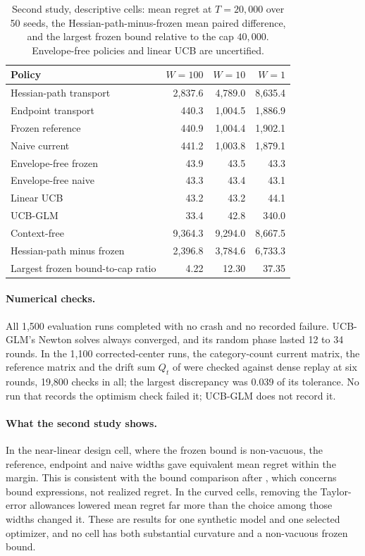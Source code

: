 \begin{table}[H]
\centering
\caption{Second study, descriptive cells: mean regret at $T=20{,}000$ over 50
seeds, the Hessian-path-minus-frozen mean paired
difference, and the largest frozen bound relative to the cap $40{,}000$.
Envelope-free policies and linear UCB are uncertified.}
\label{tab:transport-v3-descriptive}
\begin{tabular}{@{}lrrr@{}}
\toprule
Policy & $W=100$ & $W=10$ & $W=1$ \\
\midrule
Hessian-path transport & 2{,}837.6 & 4{,}789.0 & 8{,}635.4 \\
Endpoint transport & 440.3 & 1{,}004.5 & 1{,}886.9 \\
Frozen reference & 440.9 & 1{,}004.4 & 1{,}902.1 \\
Naive current & 441.2 & 1{,}003.8 & 1{,}879.1 \\
Envelope-free frozen & 43.9 & 43.5 & 43.3 \\
Envelope-free naive & 43.3 & 43.4 & 43.1 \\
Linear UCB & 43.2 & 43.2 & 44.1 \\
UCB-GLM & 33.4 & 42.8 & 340.0 \\
Context-free & 9{,}364.3 & 9{,}294.0 & 8{,}667.5 \\
\midrule
Hessian-path minus frozen & 2{,}396.8 & 3{,}784.6 & 6{,}733.3 \\
Largest frozen bound-to-cap ratio & 4.22 & 12.30 & 37.35 \\
\bottomrule
\end{tabular}
\end{table}

\paragraph{Numerical checks.}
All 1,500 evaluation runs completed with no crash and no recorded failure.
UCB-GLM's Newton solves always converged, and its random phase lasted 12 to 34
rounds. In the 1,100 corrected-center runs, the category-count current matrix,
the reference matrix and the drift sum $Q_t$ of  were
checked against dense replay at six rounds, 19,800 checks in all; the largest
discrepancy was 0.039 of its tolerance. No run that records the optimism
check failed it; UCB-GLM does not record it.

\paragraph{What the second study shows.}
In the near-linear design cell, where the frozen bound is non-vacuous, the
reference, endpoint and naive widths gave equivalent mean regret within the
margin. This is consistent with the bound comparison after
, which concerns bound expressions, not realized
regret. In the curved cells, removing the Taylor-error allowances lowered mean
regret far more than the choice among those widths changed it. These are
results for one synthetic model and one selected optimizer, and no cell has
both substantial curvature and a non-vacuous frozen bound.
